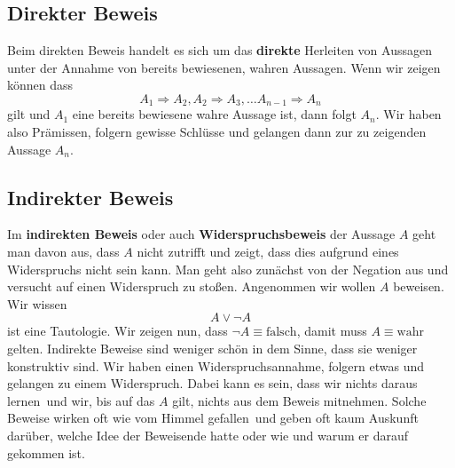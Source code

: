\subsection{Direkter Beweis}
Beim direkten Beweis handelt es sich um das \textbf{direkte} Herleiten von Aussagen unter der Annahme von bereits bewiesenen, wahren Aussagen. Wenn wir zeigen können dass 
\begin{equation*}
A_1 \Rightarrow A_2, A_2 \Rightarrow A_3, \ldots A_{n-1} \Rightarrow A_n
\end{equation*}
gilt und $A_1$ eine bereits bewiesene wahre Aussage ist, dann folgt $A_n$. Wir haben also Prämissen, folgern gewisse Schlüsse und gelangen dann zur zu zeigenden Aussage $A_n$.

\subsection{Indirekter Beweis}
Im \textbf{indirekten Beweis} oder auch \textbf{Widerspruchsbeweis} der Aussage $A$ geht man davon aus, dass $A$ nicht zutrifft und zeigt, dass dies aufgrund eines Widerspruchs nicht sein kann. Man geht also zunächst von der Negation aus und versucht auf einen Widerspruch zu stoßen. Angenommen wir wollen $A$ beweisen. Wir wissen
\begin{equation*}
A \lor \neg A
\end{equation*}
ist eine Tautologie. Wir zeigen nun, dass $\neg A \equiv \text{falsch}$, damit muss $A \equiv \text{wahr}$ gelten. Indirekte Beweise sind weniger schön in dem Sinne, dass sie weniger konstruktiv sind. Wir haben einen Widerspruchsannahme, folgern etwas und gelangen zu einem Widerspruch. Dabei kann es sein, dass wir nichts daraus \glqq lernen\grqq \ und wir, bis auf das $A$ gilt, nichts aus dem Beweis \glqq mitnehmen\grqq . Solche Beweise wirken oft \glqq wie vom Himmel gefallen\grqq \ und geben oft kaum Auskunft darüber, welche Idee der Beweisende hatte oder wie und warum er darauf gekommen ist.

